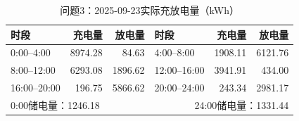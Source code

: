 \begin{table}[H]\centering\small
\caption{问题3：2025-09-23实际充放电量（kWh）}
\label{tab:q3_0923_storage}
\begin{tabular}{lrrlrr}\toprule
时段 & 充电量 & 放电量 & 时段 & 充电量 & 放电量\\\midrule
0:00--4:00 & 8974.28 & 84.63 & 4:00--8:00 & 1908.11 & 6121.76 \\
8:00--12:00 & 6293.08 & 1896.62 & 12:00--16:00 & 3941.91 & 434.00 \\
16:00--20:00 & 196.75 & 5866.62 & 20:00--24:00 & 243.34 & 2981.17 \\
\midrule\multicolumn{3}{l}{0:00储电量：1246.18} & \multicolumn{3}{r}{24:00储电量：1331.44}\\
\bottomrule\end{tabular}\end{table}
